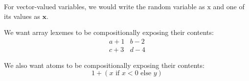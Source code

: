 For vector-valued variables, we would write the random variable as $\bm{\mathrm{x}}$ and one of its values as $\bm{x}$.


We want array lexemes to be compositionally exposing their contents:
\[ \begin{array}{cc} a+1 & b-2 \\ c+3 & d-4 \end{array} \]

We also want atoms to be compositionally exposing their contents:
\[ 1+\left( \text{$x$ if $x<0$ else $y$} \right) \]